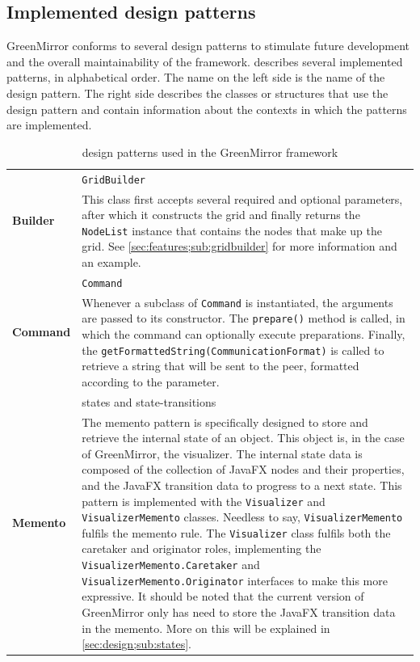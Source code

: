 \subsection{Implemented design patterns}\label{sec:design;sub:patterns}
GreenMirror conforms to several design patterns \cite{kuchana2004,sourcemaking} to stimulate future development and the overall maintainability of the framework.  describes several implemented patterns, in alphabetical order. The name on the left side is the name of the design pattern. The right side describes the classes or structures that use the design pattern and contain information about the contexts in which the patterns are implemented.
\newpage\begin{longtable}{ |l p{10cm}| }
\caption{design patterns used in the GreenMirror framework}\label{tab:patterns}\\
\hline\multirow{2}{*}{\textbf{Builder}}
   & \texttt{GridBuilder} \\* & This class first accepts several required and optional parameters, after which it constructs the grid and finally returns the \texttt{NodeList} instance that contains the nodes that make up the grid. See \cref{sec:features;sub:gridbuilder} for more information and an example. \\
\hline\multirow{2}{*}{\textbf{Command}}
   & \texttt{Command} \\* & Whenever a subclass of \texttt{Command} is instantiated, the arguments are passed to its constructor. The \texttt{prepare()} method is called, in which the command can optionally execute preparations. Finally, the \texttt{getFormattedString(CommunicationFormat)} is called to retrieve a string that will be sent to the peer, formatted according to the parameter. \\
\hline \multirow{2}{*}{\textbf{Memento}}
   & states and state-transitions \\* & The memento pattern is specifically designed to store and retrieve the internal state of an object. This object is, in the case of GreenMirror, the visualizer. The internal state data is composed of the collection of JavaFX nodes and their properties, and the JavaFX transition data to progress to a next state. This pattern is implemented with the \texttt{Visualizer} and \texttt{VisualizerMemento} classes. Needless to say, \texttt{VisualizerMemento} fulfils the memento rule. The \texttt{Visualizer} class fulfils both the caretaker and originator roles, implementing the \texttt{VisualizerMemento.Caretaker} and \texttt{VisualizerMemento.Originator} interfaces to make this more expressive. It should be noted that the current version of GreenMirror only has need to store the JavaFX transition data in the memento. More on this will be explained in \cref{sec:design;sub:states}. \\

\end{longtable}
